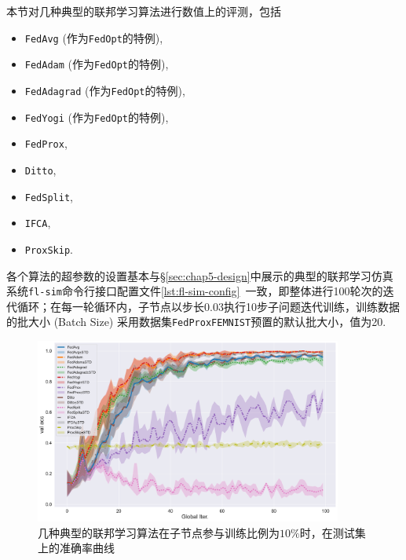 本节对几种典型的联邦学习算法进行数值上的评测，包括
\begin{itemize}
    \item \texttt{FedAvg}\cite{mcmahan2017fed_avg} (作为\texttt{FedOpt}\cite{reddi2020fed_opt}的特例),
    \item \texttt{FedAdam}\cite{reddi2020fed_opt, adam} (作为\texttt{FedOpt}\cite{reddi2020fed_opt}的特例),
    \item \texttt{FedAdagrad}\cite{reddi2020fed_opt, adagrad} (作为\texttt{FedOpt}\cite{reddi2020fed_opt}的特例),
    \item \texttt{FedYogi}\cite{reddi2020fed_opt, Zaheer_2018_yogi} (作为\texttt{FedOpt}\cite{reddi2020fed_opt}的特例),
    \item \texttt{FedProx}\cite{sahu2018fedprox},
    \item \texttt{Ditto}\cite{li_2021_ditto},
    \item \texttt{FedSplit}\cite{pathak2020fedsplit},
    \item \texttt{IFCA}\cite{Ghosh_2022_cfl},
    \item \texttt{ProxSkip}\cite{proxskip}.
\end{itemize}
各个算法的超参数的设置基本与\S\ref{sec:chap5-design}中展示的典型的联邦学习仿真系统\texttt{fl-sim}命令行接口配置文件\ref{lst:fl-sim-config}~一致，即整体进行100轮次的迭代循环；在每一轮循环内，子节点以步长0.03执行10步子问题迭代训练，训练数据的批大小 (Batch Size) 采用数据集\texttt{FedProxFEMNIST}预置的默认批大小，值为20.

\begin{figure}[ht]
    \centering
    \includegraphics[width=0.9\textwidth]{figures/standard-test-ratio-10-val-acc.pdf}
    \caption{几种典型的联邦学习算法在子节点参与训练比例为$10\%$时，在测试集上的准确率曲线}
    \label{fig:standard-test-ratio-10-val-acc}
\end{figure}

